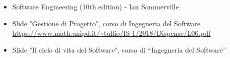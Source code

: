 \begin{itemize}
    \item Software Engineering (10th edition) - Ian Sommerville
    \item Slide "Gestione di Progetto", corso di Ingegneria del Software
          \newline \url{https://www.math.unipd.it/~tullio/IS-1/2018/Dispense/L06.pdf}
    \item Slide "Il ciclo di vita del Software", corso di “Ingegneria del Software”
\end{itemize}